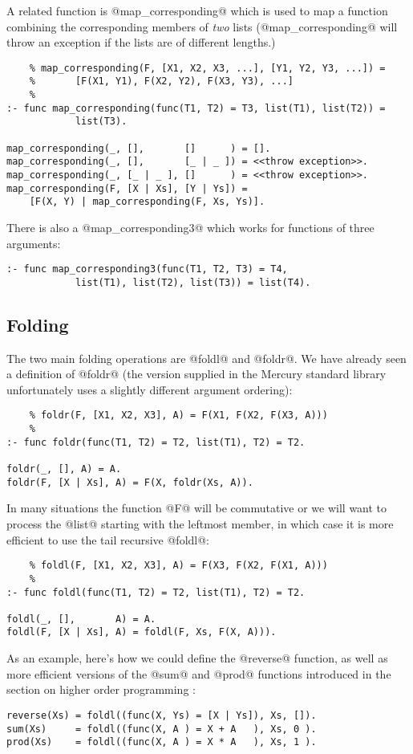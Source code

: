 A related function is @map_corresponding@ which is used to map a
function combining the corresponding members of \emph{two} lists
(@map_corresponding@ will throw an exception if the lists are of
different lengths.)
\begin{verbatim}
    % map_corresponding(F, [X1, X2, X3, ...], [Y1, Y2, Y3, ...]) =
    %       [F(X1, Y1), F(X2, Y2), F(X3, Y3), ...]
    %
:- func map_corresponding(func(T1, T2) = T3, list(T1), list(T2)) =
            list(T3).

map_corresponding(_, [],       []      ) = [].
map_corresponding(_, [],       [_ | _ ]) = <<throw exception>>.
map_corresponding(_, [_ | _ ], []      ) = <<throw exception>>.
map_corresponding(F, [X | Xs], [Y | Ys]) =
    [F(X, Y) | map_corresponding(F, Xs, Ys)].
\end{verbatim}

There is also a @map_corresponding3@ which works for functions of three
arguments:
\begin{verbatim}
:- func map_corresponding3(func(T1, T2, T3) = T4,
            list(T1), list(T2), list(T3)) = list(T4).
\end{verbatim}


\subsection{Folding}

The two main folding operations are @foldl@ and @foldr@.  We have
already seen a definition of @foldr@ (the version supplied in the
Mercury standard library unfortunately uses a slightly different
argument ordering):
\begin{verbatim}
    % foldr(F, [X1, X2, X3], A) = F(X1, F(X2, F(X3, A)))
    %
:- func foldr(func(T1, T2) = T2, list(T1), T2) = T2.

foldr(_, [], A) = A.
foldr(F, [X | Xs], A) = F(X, foldr(Xs, A)).
\end{verbatim}
In many situations the function @F@ will be commutative or we will want
to process the @list@ starting with the leftmost member, in which case
it is more efficient to use the tail recursive @foldl@:
\begin{verbatim}
    % foldl(F, [X1, X2, X3], A) = F(X3, F(X2, F(X1, A)))
    %
:- func foldl(func(T1, T2) = T2, list(T1), T2) = T2.

foldl(_, [],       A) = A.
foldl(F, [X | Xs], A) = foldl(F, Xs, F(X, A))).
\end{verbatim}
As an example, here's how we could define the @reverse@ function, as
well as more efficient versions of the @sum@ and @prod@ functions
introduced in the section on higher order programming \XXX{}:
\begin{verbatim}
reverse(Xs) = foldl((func(X, Ys) = [X | Ys]), Xs, []).
sum(Xs)     = foldl((func(X, A ) = X + A   ), Xs, 0 ).
prod(Xs)    = foldl((func(X, A ) = X * A   ), Xs, 1 ).
\end{verbatim}

